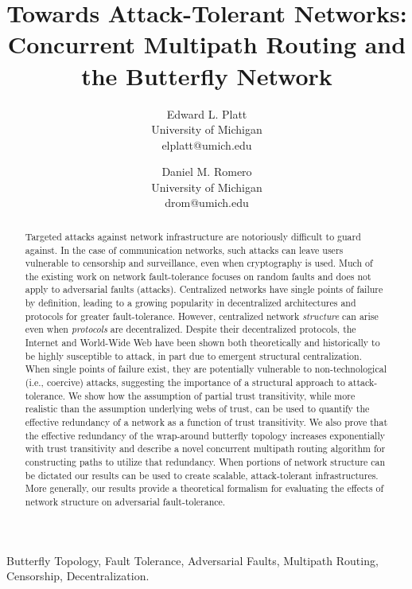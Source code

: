 \documentclass[twocolumn]{article}
\begin{document}
\title{Towards Attack-Tolerant Networks: Concurrent Multipath Routing and the Butterfly Network}
\author{
Edward L. Platt \\
University of Michigan\\
elplatt@umich.edu
\and
Daniel M. Romero \\
University of Michigan\\
drom@umich.edu
}
\date{}

\maketitle
\begin{abstract}
Targeted attacks against network infrastructure are notoriously difficult
to guard against.
In the case of communication networks,
such attacks can leave users vulnerable to
censorship and surveillance,
even when cryptography is used.
Much of the existing work on network fault-tolerance focuses on random faults and
does not apply to adversarial faults (attacks).
Centralized networks have single points of failure by definition,
leading to a growing popularity in decentralized architectures and protocols
for greater fault-tolerance.
However, centralized network {\em structure} can arise even when {\em protocols} are
decentralized.
Despite their decentralized protocols,
the Internet and World-Wide Web have
been shown both theoretically and historically to be highly susceptible to
attack, in part due to emergent structural centralization.
When single points of failure exist,
they are potentially vulnerable to non-technological
(i.e., coercive) attacks,
suggesting the importance of a structural approach to attack-tolerance.
We show how the assumption of partial trust transitivity,
while more realistic than the assumption underlying webs of trust,
can be used to quantify the effective redundancy of a network
as a function of trust transitivity.
We also prove that the effective redundancy of the wrap-around butterfly topology
increases exponentially with trust transitivity and
describe a novel concurrent multipath routing algorithm for constructing
paths to utilize that redundancy.
When portions of network structure can be dictated
our results can be used to create scalable,
attack-tolerant infrastructures.
More generally, our results provide a theoretical formalism for evaluating the effects
of network structure on adversarial fault-tolerance.
\end{abstract}


Butterfly Topology,
Fault Tolerance,
Adversarial Faults,
Multipath Routing,
Censorship,
Decentralization.
\end{document}
